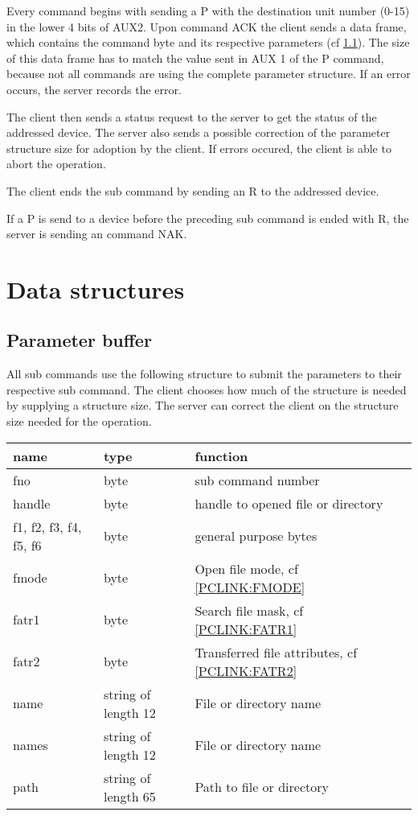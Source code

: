 \documentclass[10pt]{article}
\begin{document}
Every command begins with sending a P with the destination unit number (0-15) in the lower 4 bits of AUX2. Upon command ACK the client sends a data frame, which contains the command byte and its respective parameters (cf \ref{PCLINK:PARBUF}). The size of this data frame has to match the value sent in AUX 1 of the P command, because not all commands are using the complete parameter structure. If an error occurs, the server records the error.

The client then sends a status request to the server to get the status of the addressed device.
The server also sends a possible correction of the parameter structure size for adoption by the client. If errors occured, the client is able to abort the operation.

The client ends the sub command by sending an R to the addressed device.

If a P is send to a device before the preceding sub command is ended with R, the server is sending an command NAK. 


\section{Data structures}
\subsection{ Parameter buffer }\label{PCLINK:PARBUF}
All sub commands use the following structure to submit the parameters to their respective sub command. The client chooses how much of the structure is needed by supplying a structure size. The server can correct the client on the structure size needed for the operation. 

\begin{tabular}{l|l|l}
name & type & function \\ \hline
fno & byte & sub command number \\
handle & byte & handle to opened file or directory \\
f1, f2, f3, f4, f5, f6 & byte & general purpose bytes \\
fmode & byte & Open file mode, cf \ref{PCLINK:FMODE} \\
fatr1 & byte & Search file mask, cf \ref{PCLINK:FATR1} \\
fatr2 & byte & Transferred file attributes, cf \ref{PCLINK:FATR2} \\
name & string of length 12 & File or directory name \\
names & string of length 12 & File or directory name \\
path & string of length 65 & Path to file or directory
\end{tabular}
\end{document}
